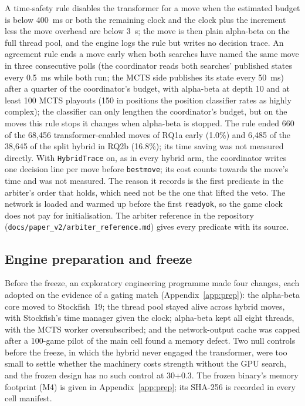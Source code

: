 \documentclass{article}
\newif\ifanon
\newcommand{\depositcite}{\ifanon\cite{anonarchive}\else\cite{zenodo}\fi}
\begin{document}
A time-safety rule disables the transformer for a move when the estimated budget is below 400~ms or both the remaining clock and the clock plus the increment less the move overhead are below 3~s; the move is then plain alpha-beta on the full thread pool, and the engine logs the rule but writes no decision trace. An agreement rule ends a move early when both searches have named the same move in three consecutive polls (the coordinator reads both searches' published states every 0.5~ms while both run; the MCTS side publishes its state every 50~ms) after a quarter of the coordinator's budget, with alpha-beta at depth 10 and at least 100 MCTS playouts (150 in positions the position classifier rates as highly complex); the classifier can only lengthen the coordinator's budget, but on the moves this rule stops it changes when alpha-beta is stopped. The rule ended 660 of the 68{,}456 transformer-enabled moves of RQ1a early (1.0\%) and 6{,}485 of the 38{,}645 of the split hybrid in RQ2b (16.8\%); its time saving was not measured directly. %
With \texttt{HybridTrace} on, as in every hybrid arm, the coordinator writes one decision line per move before \texttt{bestmove}; its cost counts towards the move's time and was not measured. The reason it records is the first predicate in the arbiter's order that holds, which need not be the one that lifted the veto. The network is loaded and warmed up before the first \texttt{readyok}, so the game clock does not pay for initialisation. The arbiter reference \ifanon in the archive~\depositcite{}\else in the repository (\texttt{docs/paper\_v2/arbiter\_reference.md})\fi{} gives every predicate with its source. %

\subsection{Engine preparation and freeze}
\label{sec:prep}
Before the freeze, an exploratory engineering programme made four changes, each adopted on the evidence of a gating match (Appendix~\ref{app:prep}): the alpha-beta core moved to Stockfish~19; the thread pool stayed alive across hybrid moves, with Stockfish's time manager given the clock; alpha-beta kept all eight threads, with the MCTS worker oversubscribed; and the network-output cache was capped after a 100-game pilot of the main cell found a memory defect. Two null controls before the freeze, in which the hybrid never engaged the transformer, were too small to settle whether the machinery costs strength without the GPU search, and the frozen design has no such control at 30+0.3. %
The frozen binary's memory footprint (M4) is given in Appendix~\ref{app:prep}; its SHA-256 is recorded in every cell manifest.
\end{document}
